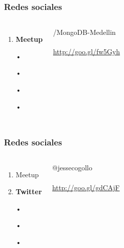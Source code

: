 \documentclass{beamer}
\begin{document}
\begin{frame}
\frametitle{Redes sociales}
\begin{columns}[c] %

\begin{enumerate}
\item \textbf{Meetup}
\item[•]
\item[•]
\item[•]
\item[•]
\end{enumerate}

{\color{blue}/MongoDB-Medellin}
\\~\\
{\color{blue}\url{http://goo.gl/fw5Gyh}}
\end{columns}
\end{frame}

\begin{frame}
\frametitle{Redes sociales}
\begin{columns}[c] %

\begin{enumerate}
\item Meetup
\item \textbf{Twitter}
\item[•]
\item[•]
\item[•]
\end{enumerate}

{\color{blue}@jessecogollo}
\\~\\
{\color{blue}\url{http://goo.gl/gdCAjF}}
\end{columns}
\end{frame}
\end{document}
